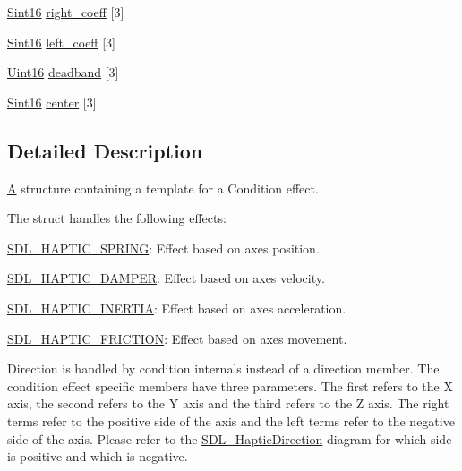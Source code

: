 \begin{DoxyCompactItemize}
\item 
\mbox{\hyperlink{_s_d_l__stdinc_8h_a9d0257032c0e146ab6121bf0122712f5}{Sint16}} \mbox{\hyperlink{struct_s_d_l___haptic_condition_a3de7f164ef88841255535387d0f100b6}{right\+\_\+coeff}} \mbox{[}3\mbox{]}
\item 
\mbox{\hyperlink{_s_d_l__stdinc_8h_a9d0257032c0e146ab6121bf0122712f5}{Sint16}} \mbox{\hyperlink{struct_s_d_l___haptic_condition_a2adf52c32f60f0b6826b1e3add2eae7a}{left\+\_\+coeff}} \mbox{[}3\mbox{]}
\item 
\mbox{\hyperlink{_s_d_l__stdinc_8h_a31fcc0a076c9068668173ee26d33e42b}{Uint16}} \mbox{\hyperlink{struct_s_d_l___haptic_condition_af684c8eeeb719739a32723c00c5a2bbd}{deadband}} \mbox{[}3\mbox{]}
\item 
\mbox{\hyperlink{_s_d_l__stdinc_8h_a9d0257032c0e146ab6121bf0122712f5}{Sint16}} \mbox{\hyperlink{struct_s_d_l___haptic_condition_a8a71ec28ff5ab85246cbc59736aa2c53}{center}} \mbox{[}3\mbox{]}
\end{DoxyCompactItemize}


\subsection{Detailed Description}
\mbox{\hyperlink{struct_a}{A}} structure containing a template for a Condition effect. 

The struct handles the following effects\+:
\begin{DoxyItemize}
\item \mbox{\hyperlink{_s_d_l__haptic_8h_a3b52d4700380085e2b5d87bb20320fb1}{S\+D\+L\+\_\+\+H\+A\+P\+T\+I\+C\+\_\+\+S\+P\+R\+I\+NG}}\+: Effect based on axes position.
\item \mbox{\hyperlink{_s_d_l__haptic_8h_a69522f261973e3ea4273486141320a87}{S\+D\+L\+\_\+\+H\+A\+P\+T\+I\+C\+\_\+\+D\+A\+M\+P\+ER}}\+: Effect based on axes velocity.
\item \mbox{\hyperlink{_s_d_l__haptic_8h_a14b807471589120395aec28293cf6642}{S\+D\+L\+\_\+\+H\+A\+P\+T\+I\+C\+\_\+\+I\+N\+E\+R\+T\+IA}}\+: Effect based on axes acceleration.
\item \mbox{\hyperlink{_s_d_l__haptic_8h_a98a5011311168d63921aaac21403a4d8}{S\+D\+L\+\_\+\+H\+A\+P\+T\+I\+C\+\_\+\+F\+R\+I\+C\+T\+I\+ON}}\+: Effect based on axes movement.
\end{DoxyItemize}

Direction is handled by condition internals instead of a direction member. The condition effect specific members have three parameters. The first refers to the X axis, the second refers to the Y axis and the third refers to the Z axis. The right terms refer to the positive side of the axis and the left terms refer to the negative side of the axis. Please refer to the \mbox{\hyperlink{struct_s_d_l___haptic_direction}{S\+D\+L\+\_\+\+Haptic\+Direction}} diagram for which side is positive and which is negative.

